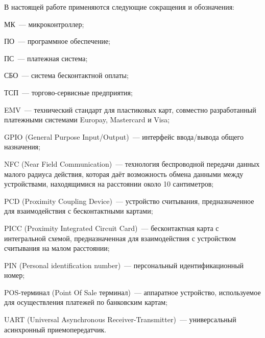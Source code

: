\newpage


В настоящей работе применяются следующие сокращения и обозначения:

\begin{description}

	\item МК~--- микроконтроллер;
	\item ПО~--- программное обеспечение;
	\item ПС~--- платежная система;
	\item СБО~--- система бесконтактной оплаты;
	\item ТСП~--- торгово-сервисные предприятия;

	\item EMV~--- технический стандарт для пластиковых карт, совместно разработанный платежными системами Europay, Mastercard и Visa;
	\item GPIO (General Purpose Input/Output)~--- интерфейс ввода/вывода общего назначения;
	\item NFC (Near Field Communication)~--- технология беспроводной передачи данных малого радиуса действия, которая даёт возможность обмена данными между устройствами, находящимися на расстоянии около 10 сантиметров;
	\item PCD (Proximity Coupling Device)~--- устройство считывания, предназначенное для взаимодействия с бесконтактными картами;
	\item PICC (Proximity Integrated Circuit Card)~--- бесконтактная карта с интегральной схемой, предназначенная для взаимодействия с устройством считывания на малом расстоянии;
	\item PIN (Personal identification number)~--- персональный идентификационный номер;
	\item POS-терминал (Point Of Sale терминал)~--- аппаратное устройство, используемое для осуществления платежей по банковским картам;
	\item UART (Universal Asynchronous Receiver-Transmitter)~--- универсальный асинхронный приемопередатчик.

\item \end{description}
